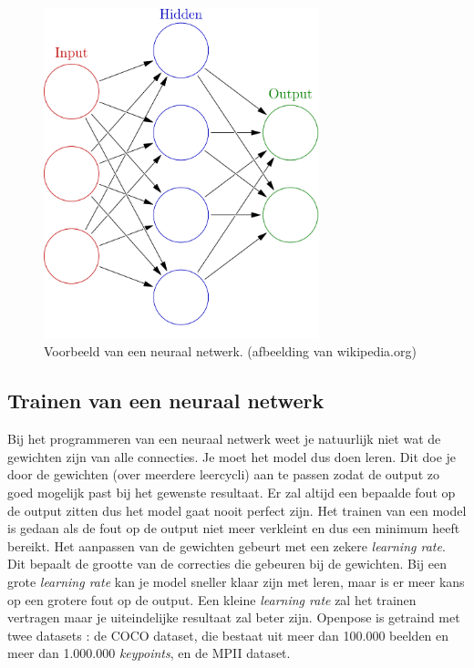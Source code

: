 \documentclass[a4paper,twoside,kulak]{kulakreport}
\begin{document}
\begin{figure}
	\begin{center}
		\includegraphics[width=8cm]{netwerk.png}
	\end{center}
	\caption{Voorbeeld van een neuraal netwerk. (afbeelding van wikipedia.org)}
	\label{netwerk}
\end{figure}

\subsection{Trainen van een neuraal netwerk}
Bij het programmeren van een neuraal netwerk weet je natuurlijk niet wat de gewichten zijn van alle connecties. Je moet het model dus doen leren. Dit doe je door de gewichten (over meerdere leercycli) aan te passen zodat de output zo goed mogelijk past bij het gewenste resultaat. Er zal altijd een bepaalde fout op de output zitten dus het model gaat nooit perfect zijn. Het trainen van een model is gedaan als de fout op de output niet meer verkleint en dus een minimum heeft bereikt. Het aanpassen van de gewichten gebeurt met een zekere \emph{learning rate}. Dit bepaalt de grootte van de correcties die gebeuren bij de gewichten. Bij een grote \emph{learning rate} kan je model sneller klaar zijn met leren, maar is er meer kans op een grotere fout op de output. Een kleine \emph{learning rate} zal het trainen vertragen maar je uiteindelijke resultaat zal beter zijn. Openpose is getraind met twee datasets \cite{openpose}: de COCO dataset, die bestaat uit meer dan 100.000 beelden en meer dan 1.000.000 \emph{keypoints}, en de MPII dataset.
\end{document}
